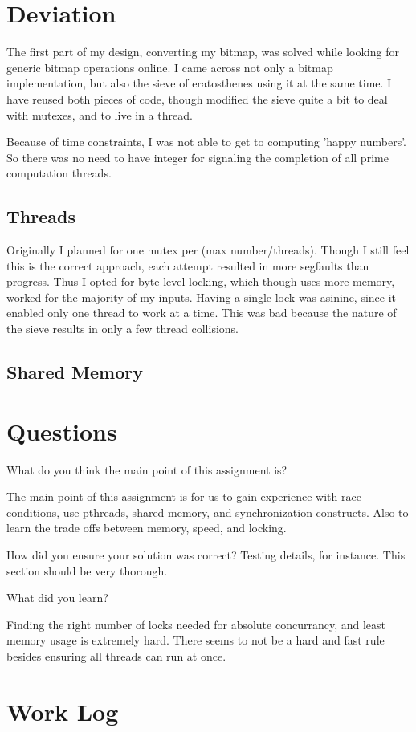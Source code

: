 \documentclass[letterpaper,10pt]{article}
\begin{document}
\section{Deviation}
The first part of my design, converting my bitmap, was solved while
looking for generic bitmap operations online. I came across not only a
bitmap implementation, but also the sieve of eratosthenes using it at
the same time. I have reused both pieces of code, though modified the
sieve quite a bit to deal with mutexes, and to live in a thread.

Because of time constraints, I was not able to get to computing 'happy
numbers'. So there was no need to have integer for signaling the
completion of all prime computation threads.

\subsection{Threads}
Originally I planned for one mutex per (max number/threads). Though I
still feel this is the correct approach, each attempt resulted in more
segfaults than progress. Thus I opted for byte level locking, which
though uses more memory, worked for the majority of my inputs. Having a
single lock was asinine, since it enabled only one thread to work at a
time. This was bad because the nature of the sieve results in only a
few thread collisions.

\subsection{Shared Memory}

\section{Questions}
\begin{description}
  \item  What do you think the main point of this assignment is?

         The main point of this assignment is for us to gain experience
         with race conditions, use pthreads, shared memory, and
         synchronization constructs. Also to learn the trade offs
         between memory, speed, and locking.

  \item  How did you ensure your solution was correct? Testing details, for
         instance. This section should be very thorough.

  \item  What did you learn?

         Finding the right number of locks needed for absolute
         concurrancy, and least memory usage is extremely hard. There
         seems to not be a hard and fast rule besides ensuring all
         threads can run at once.

\end{description}

\newpage

\section{Work Log}

%
\end{document}
